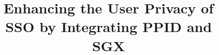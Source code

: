 \documentclass[runningheads]{llncs}
\begin{document}
%
\title{Enhancing the User Privacy of SSO by Integrating PPID and SGX
}%
%
%
\author{}
\institute{}
\begin{comment}
\author{First Author\inst{1}\orcidID{0000-1111-2222-3333} \and
Second Author\inst{2,3}\orcidID{1111-2222-3333-4444} \and
Third Author\inst{3}\orcidID{2222--3333-4444-5555}}
%
\authorrunning{F. Author et al.}
%
\institute{Princeton University, Princeton NJ 08544, USA \and
Springer Heidelberg, Tiergartenstr. 17, 69121 Heidelberg, Germany
\email{lncs@springer.com}\\
\url{http://www.springer.com/gp/computer-science/lncs} \and
ABC Institute, Rupert-Karls-University Heidelberg, Heidelberg, Germany\\
\email{\{abc,lncs\}@uni-heidelberg.de}}
\end{comment}
%
\maketitle              %
%
\end{document}
